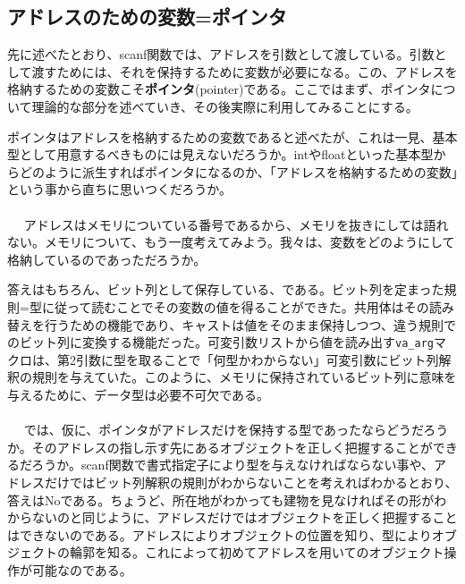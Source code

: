 \subsection{アドレスのための変数=ポインタ}
先に述べたとおり、scanf関数では、アドレスを引数として渡している。引数として渡すためには、それを保持するために変数が必要になる。この、アドレスを格納するための変数こそ\textbf{ポインタ}(pointer)である。ここではまず、ポインタについて理論的な部分を述べていき、その後実際に利用してみることにする。

ポインタはアドレスを格納するための変数であると述べたが、これは一見、基本型として用意するべきものには見えないだろうか。intやfloatといった基本型からどのように派生すればポインタになるのか、「アドレスを格納するための変数」という事から直ちに思いつくだろうか。
\\ \\　
アドレスはメモリについている番号であるから、メモリを抜きにしては語れない。メモリについて、もう一度考えてみよう。我々は、変数をどのようにして格納しているのであっただろうか。

答えはもちろん、ビット列として保存している、である。ビット列を定まった規則=型に従って読むことでその変数の値を得ることができた。共用体はその読み替えを行うための機能であり、キャストは値をそのまま保持しつつ、違う規則でのビット列に変換する機能だった。可変引数リストから値を読み出す\verb|va_arg|マクロは、第2引数に型を取ることで「何型かわからない」可変引数にビット列解釈の規則を与えていた。このように、メモリに保持されているビット列に意味を与えるために、データ型は必要不可欠である。
\\ \\　
では、仮に、ポインタがアドレスだけを保持する型であったならどうだろうか。そのアドレスの指し示す先にあるオブジェクトを正しく把握することができるだろうか。scanf関数で書式指定子により型を与えなければならない事や、アドレスだけではビット列解釈の規則がわからないことを考えればわかるとおり、答えはNoである。ちょうど、所在地がわかっても建物を見なければその形がわからないのと同じように、アドレスだけではオブジェクトを正しく把握することはできないのである。アドレスによりオブジェクトの位置を知り、型によりオブジェクトの輪郭を知る。これによって初めてアドレスを用いてのオブジェクト操作が可能なのである。

